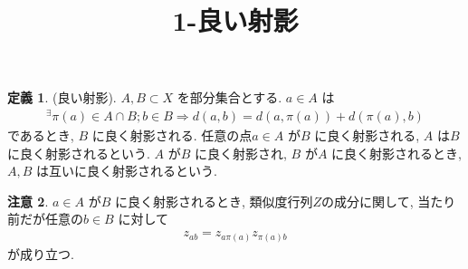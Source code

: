 \documentclass[10pt, fleqn, label-section=none]{bxjsarticle}
\title{1-良い射影}
\date{}
\author{}
\theoremstyle{definition}
\newtheorem{dfn}{定義}[section]
\newtheorem{remark}[dfn]{注意}
\newcommand{\naraba}{\Rightarrow}
\renewcommand{\;}{\, ; \,}
\begin{document}
\maketitle

\section{}

\begin{dfn}(良い射影). $A, B \subset X$ を部分集合とする. $a \in A$ は 
\begin{align*} ^\exists \pi(a) \in A \cap B ; b \in B \naraba  d(a, b) = d(a, \pi (a)) + d(\pi (a), b) \end{align*}
であるとき, $B$ に良く射影される. 任意の点$a \in A$ が$B$ に良く射影される, $A$ は$B$ に良く射影されるという. $A$ が$B$ に良く射影され, $B$ が$A$ に良く射影されるとき, $A, B$ は互いに良く射影されるという. 
\end{dfn}

\begin{remark} $a \in A$ が$B$ に良く射影されるとき, 類似度行列$Z$の成分に関して, 当たり前だが任意の$b \in B$ に対して
\begin{align*} z_{a b} = z_{a \pi(a)} z_{\pi(a) b}\end{align*}
が成り立つ. 
\end{remark}
\end{document}
